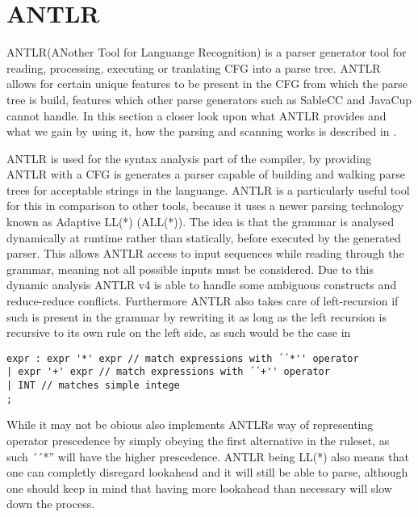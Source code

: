 \section{ANTLR}
ANTLR(ANother Tool for Languange Recognition) is a parser generator tool for reading, processing, executing or tranlating CFG into a parse tree.
ANTLR allows for certain unique features to be present in the CFG from which the parse tree is build, features which other parse generators such as SableCC and JavaCup cannot handle. 
In this section a closer look upon what ANTLR provides and what we gain by using it, how the parsing and scanning works is described in .

ANTLR is used for the syntax analysis part of the compiler, by providing ANTLR with a CFG is generates a parser capable of building and walking parse trees for acceptable strings in the languange.
ANTLR is a particularly useful tool for this in comparison to other tools, because it uses a newer parsing technology known as Adaptive LL(*) (ALL(*)).
The idea is that the grammar is analysed dynamically at runtime rather than statically, before executed by the generated parser.
This allows ANTLR access to input sequences while reading through the grammar, meaning not all possible inputs must be considered.
Due to this dynamic analysis ANTLR v4 is able to handle some ambiguous constructs and reduce-reduce conflicts.
Furthermore ANTLR also takes care of left-recursion if such is present in the grammar by rewriting it as long as the left recursion is recursive to its own rule on the left side, as such would be the case in 
\begin{lstlisting}[caption=An ambiguous rule for expr,frame=tlrb,label={lst:amb}]
expr : expr '*' expr // match expressions with ´´*'' operator
| expr '+' expr // match expressions with ´´+'' operator
| INT // matches simple intege
;
\end{lstlisting}
While it may not be obious  also implements ANTLRs way of representing operator prescedence by simply obeying the first alternative in the ruleset, as such ´´*'' will have the higher prescedence.
ANTLR being LL(*) also means that one can completly disregard lookahead and it will still be able to parse, although one should keep in mind that having more lookahead than necessary will slow down the process.

